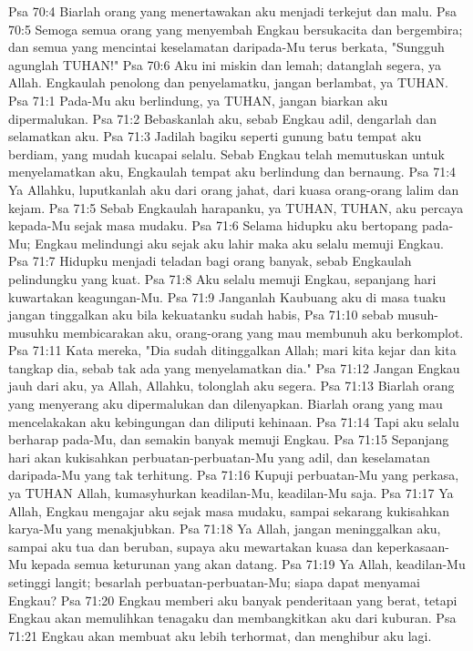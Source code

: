 Psa 70:4  Biarlah orang yang menertawakan aku menjadi terkejut dan malu.
Psa 70:5  Semoga semua orang yang menyembah Engkau bersukacita dan bergembira; dan semua yang mencintai keselamatan daripada-Mu terus berkata, "Sungguh agunglah TUHAN!"
Psa 70:6  Aku ini miskin dan lemah; datanglah segera, ya Allah. Engkaulah penolong dan penyelamatku, jangan berlambat, ya TUHAN.
Psa 71:1  Pada-Mu aku berlindung, ya TUHAN, jangan biarkan aku dipermalukan.
Psa 71:2  Bebaskanlah aku, sebab Engkau adil, dengarlah dan selamatkan aku.
Psa 71:3  Jadilah bagiku seperti gunung batu tempat aku berdiam, yang mudah kucapai selalu. Sebab Engkau telah memutuskan untuk menyelamatkan aku, Engkaulah tempat aku berlindung dan bernaung.
Psa 71:4  Ya Allahku, luputkanlah aku dari orang jahat, dari kuasa orang-orang lalim dan kejam.
Psa 71:5  Sebab Engkaulah harapanku, ya TUHAN, TUHAN, aku percaya kepada-Mu sejak masa mudaku.
Psa 71:6  Selama hidupku aku bertopang pada-Mu; Engkau melindungi aku sejak aku lahir maka aku selalu memuji Engkau.
Psa 71:7  Hidupku menjadi teladan bagi orang banyak, sebab Engkaulah pelindungku yang kuat.
Psa 71:8  Aku selalu memuji Engkau, sepanjang hari kuwartakan keagungan-Mu.
Psa 71:9  Janganlah Kaubuang aku di masa tuaku jangan tinggalkan aku bila kekuatanku sudah habis,
Psa 71:10  sebab musuh-musuhku membicarakan aku, orang-orang yang mau membunuh aku berkomplot.
Psa 71:11  Kata mereka, "Dia sudah ditinggalkan Allah; mari kita kejar dan kita tangkap dia, sebab tak ada yang menyelamatkan dia."
Psa 71:12  Jangan Engkau jauh dari aku, ya Allah, Allahku, tolonglah aku segera.
Psa 71:13  Biarlah orang yang menyerang aku dipermalukan dan dilenyapkan. Biarlah orang yang mau mencelakakan aku kebingungan dan diliputi kehinaan.
Psa 71:14  Tapi aku selalu berharap pada-Mu, dan semakin banyak memuji Engkau.
Psa 71:15  Sepanjang hari akan kukisahkan perbuatan-perbuatan-Mu yang adil, dan keselamatan daripada-Mu yang tak terhitung.
Psa 71:16  Kupuji perbuatan-Mu yang perkasa, ya TUHAN Allah, kumasyhurkan keadilan-Mu, keadilan-Mu saja.
Psa 71:17  Ya Allah, Engkau mengajar aku sejak masa mudaku, sampai sekarang kukisahkan karya-Mu yang menakjubkan.
Psa 71:18  Ya Allah, jangan meninggalkan aku, sampai aku tua dan beruban, supaya aku mewartakan kuasa dan keperkasaan-Mu kepada semua keturunan yang akan datang.
Psa 71:19  Ya Allah, keadilan-Mu setinggi langit; besarlah perbuatan-perbuatan-Mu; siapa dapat menyamai Engkau?
Psa 71:20  Engkau memberi aku banyak penderitaan yang berat, tetapi Engkau akan memulihkan tenagaku dan membangkitkan aku dari kuburan.
Psa 71:21  Engkau akan membuat aku lebih terhormat, dan menghibur aku lagi.
